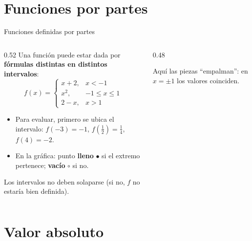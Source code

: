 \documentclass[10pt,aspectratio=169]{beamer}
\begin{document}
\section{Funciones por partes}

\begin{frame}{Funciones definidas por partes}
  \begin{columns}
    \begin{column}{0.52\textwidth}
      Una función puede estar dada por \textbf{fórmulas distintas en distintos intervalos}:
      \[ f(x)=\begin{cases}x+2,&x<-1\\ x^2,&-1\le x\le1\\ 2-x,&x>1\end{cases} \]
      \begin{itemize}
        \item Para evaluar, primero se ubica el intervalo: $f(-3)=-1$, $f(\frac12)=\frac14$, $f(4)=-2$.
        \item En la gráfica: punto \textbf{lleno} $\bullet$ si el extremo pertenece; \textbf{vacío} $\circ$ si no.
      \end{itemize}
      \begin{observacion}
        Los intervalos no deben solaparse (si no, $f$ no estaría bien definida).
      \end{observacion}
    \end{column}
    \begin{column}{0.48\textwidth}
      \centering

      \small Aquí las piezas ``empalman'': en $x=\pm1$ los valores coinciden.
    \end{column}
  \end{columns}
\end{frame}

\section{Valor absoluto}
\end{document}
